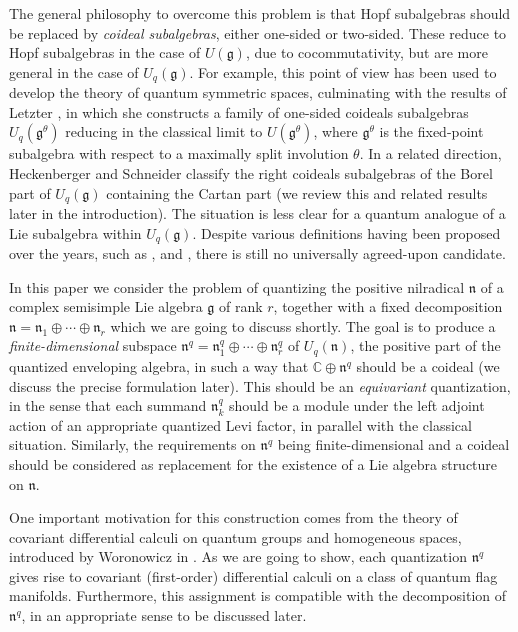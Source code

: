 \documentclass[a4paper, 12pt, reqno, english]{amsart}
\numberwithin{equation}{section}
\numberwithin{figure}{section}
\theoremstyle{plain}
\theoremstyle{plain}
\theoremstyle{plain}
\theoremstyle{plain}
\theoremstyle{plain}
\theoremstyle{definition}
\theoremstyle{definition}
\theoremstyle{definition}
\theoremstyle{remark}
\theoremstyle{definition}
\theoremstyle{definition}
\newcommand{\Uqg}{U_q(\mathfrak{g})}
\newcommand{\Uqn}{U_q(\mathfrak{n})}
\newcommand{\bbC}{\mathbb{C}}
\newcommand{\lieg}{\mathfrak{g}}
\newcommand{\lien}{\mathfrak{n}}
\newcommand{\qnil}{\lien^q}
\begin{document}
The general philosophy to overcome this problem is that Hopf subalgebras should be replaced by \emph{coideal subalgebras}, either one-sided or two-sided. These reduce to Hopf subalgebras in the case of $U(\lieg)$, due to cocommutativity, but are more general in the case of $\Uqg$.
For example, this point of view has been used to develop the theory of quantum symmetric spaces, culminating with the results of Letzter \cite{letzter, letzter-review}, in which she constructs a family of one-sided coideals subalgebras $U_q(\lieg^\theta)$ reducing in the classical limit to $U(\lieg^\theta)$, where $\lieg^\theta$ is the fixed-point subalgebra with respect to a maximally split involution $\theta$.
In a related direction, Heckenberger and Schneider \cite{heckenberger-schneider} classify the right coideals subalgebras of the Borel part of $\Uqg$ containing the Cartan part (we review this and related results later in the introduction).
The situation is less clear for a quantum analogue of a Lie subalgebra within $\Uqg$.
Despite various definitions having been proposed over the years, such as \cite{majid-lie-algebras}, \cite{delius-gould} and \cite{generalized-an}, there is still no universally agreed-upon candidate.

In this paper we consider the problem of quantizing the positive nilradical $\lien$ of a complex semisimple Lie algebra $\lieg$ of rank $r$, together with a fixed decomposition $\lien = \lien_1 \oplus \cdots \oplus \lien_r$ which we are going to discuss shortly. The goal is to produce a \emph{finite-dimensional} subspace $\qnil = \qnil_1 \oplus \cdots \oplus \qnil_r$ of $\Uqn$, the positive part of the quantized enveloping algebra, in such a way that $\bbC \oplus \qnil$ should be a coideal (we discuss the precise formulation later).
This should be an \emph{equivariant} quantization, in the sense that each summand $\qnil_k$ should be a module under the left adjoint action of an appropriate quantized Levi factor, in parallel with the classical situation.
Similarly, the requirements on $\qnil$ being finite-dimensional and a coideal should be considered as replacement for the existence of a Lie algebra structure on $\lien$.

One important motivation for this construction comes from the theory of covariant differential calculi on quantum groups and homogeneous spaces, introduced by Woronowicz in \cite{woronowicz}.
As we are going to show, each quantization $\qnil$ gives rise to covariant (first-order) differential calculi on a class of quantum flag manifolds.
Furthermore, this assignment is compatible with the decomposition of $\qnil$, in an appropriate sense to be discussed later.
\end{document}
